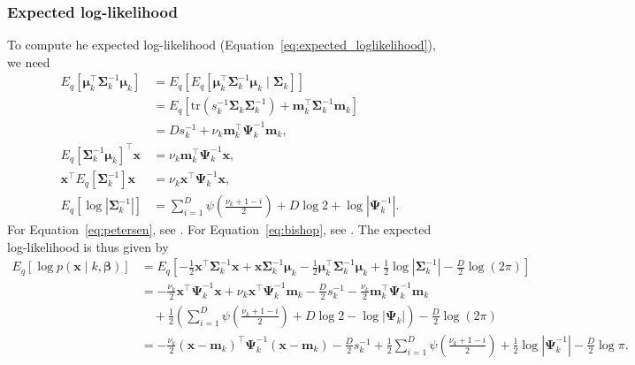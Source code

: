 \documentclass[a4paper]{article}
\begin{document}
			\subsubsection*{Expected log-likelihood}

			To compute he expected log-likelihood (Equation~\ref{eq:expected_loglikelihood}), we need
			\begin{align}
				E_q\left[ \bm{\mu}_k^\top \bm{\Sigma}_k^{-1} \bm{\mu}_k \right]
				&= E_q\left[ E_q\left[ \bm{\mu}_k^\top \bm{\Sigma}_k^{-1} \bm{\mu}_k \mid \bm{\Sigma}_k \right] \right] \\
				\label{eq:petersen}
				&= E_q\left[ \text{tr}\left(s_k^{-1}\bm{\Sigma}_k\bm{\Sigma}_{k}^{-1}\right) + \mathbf{m}_k^\top \bm{\Sigma}_k^{-1} \mathbf{m}_k\right] \\
				&= Ds_k^{-1} + \nu_k \mathbf{m}_k^\top \bm{\Psi}_k^{-1} \mathbf{m}_k, \\
				E_q\left[\bm{\Sigma}_k^{-1} \bm{\mu}_k \right]^\top \mathbf{x}
				&= \nu_k \mathbf{m}_k^\top \bm{\Psi}_k^{-1} \mathbf{x}, \\
				\mathbf{x}^\top E_q\left[ \bm{\Sigma}_k^{-1} \right] \mathbf{x}
				&= \nu_k \mathbf{x}^\top \bm{\Psi}_k^{-1} \mathbf{x}, \\
				\label{eq:bishop}
				E_q\left[\log |\bm{\Sigma}_k^{-1}|\right]
				&= \sum_{i = 1}^D \psi\left( \frac{\nu_k + 1 - i}{2} \right) + D\log 2 + \log|\bm{\Psi}_k^{-1}|.
			\end{align}
			For Equation~\ref{eq:petersen}, see \cite{Petersen:2008}. For Equation~\ref{eq:bishop}, see \cite{Bishop:2006}.
			The expected log-likelihood is thus given by
			\begin{align}
				E_q\left[ \log p(\mathbf{x} \mid k, \bm{\beta}) \right]
				&= E_q\left[ -\frac{1}{2}\mathbf{x}^\top \bm{\Sigma}_k^{-1} \mathbf{x} + \mathbf{x}\bm{\Sigma}_k^{-1} \bm{\mu}_k - \frac{1}{2}\bm{\mu}_k^\top \bm{\Sigma}_k^{-1} \bm{\mu}_k + \frac{1}{2} \log |\bm{\Sigma}_k^{-1}| - \frac{D}{2}\log(2\pi)\right] \\
				&= - \frac{\nu_k}{2} \mathbf{x}^\top \bm{\Psi}_k^{-1} \mathbf{x} + \nu_k \mathbf{x}^\top \bm{\Psi}_k^{-1} \mathbf{m}_k
				- \frac{D}{2} s_k^{-1} - \frac{\nu_k}{2} \mathbf{m}_k^\top \bm{\Psi}_k^{-1} \mathbf{m}_k \\
				&\quad + \frac{1}{2} \left(\sum_{i = 1}^D \psi\left( \frac{\nu_k + 1 - i}{2} \right) + D \log 2 - \log|\bm{\Psi}_k| \right)
				- \frac{D}{2} \log(2\pi) \\
				&= - \frac{\nu_k}{2} (\mathbf{x} - \mathbf{m}_k)^\top \bm{\Psi}_k^{-1} (\mathbf{x} - \mathbf{m}_k)
				- \frac{D}{2} s_k^{-1} + \frac{1}{2} \sum_{i = 1}^D \psi\left( \frac{\nu_k + 1 - i}{2} \right) + \frac{1}{2} \log|\bm{\Psi}_k^{-1}|
				- \frac{D}{2} \log\pi.
			\end{align}
\end{document}
